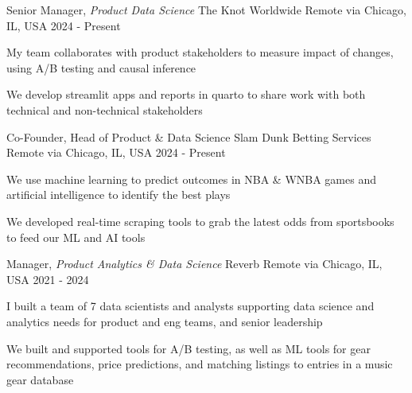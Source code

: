 
\begin{cventries}

  \cventry
    {Senior Manager,  \textit{Product Data Science}} %
    {The Knot Worldwide} %
    {Remote via Chicago, IL, USA} %
    {2024 - Present} %
    {
      \begin{cvitems}
        \item {My team collaborates with product stakeholders to measure impact of changes, using A/B testing and causal inference}
        \item {We develop streamlit apps and reports in quarto to share work with both technical and non-technical stakeholders}          
      \end{cvitems}
    }

  \cventry
    {Co-Founder, Head of Product \& Data Science} %
    {Slam Dunk Betting Services} %
    {Remote via Chicago, IL, USA} %
    {2024 - Present} %
    {
      \begin{cvitems}
        \item {We use machine learning to predict outcomes in NBA \& WNBA games and artificial intelligence to identify the best plays}
        \item {We developed real-time scraping tools to grab the latest odds from sportsbooks to feed our ML and AI tools}          
      \end{cvitems}
    }

  \cventry
    {Manager, \textit{Product Analytics \& Data Science}} %
    {Reverb} %
    {Remote via Chicago, IL, USA} %
    {2021 - 2024} %
    {
      \begin{cvitems}
        \item {I built a team of 7 data scientists and analysts supporting data science and analytics needs for product and eng teams, and senior leadership}
        \item {We built and supported tools for A/B testing, as well as ML tools for gear recommendations, price predictions, and matching listings to entries in a music gear database}  
      \end{cvitems}
    }


\end{cventries}
